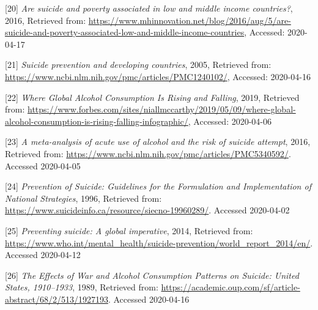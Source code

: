 \documentclass[]{article}
\begin{document}
{[}20{]} \emph{Are suicide and poverty associated in low and middle
income countries?}, 2016, Retrieved from:
\url{https://www.mhinnovation.net/blog/2016/aug/5/are-suicide-and-poverty-associated-low-and-middle-income-countries},
Accessed: 2020-04-17

{[}21{]} \emph{Suicide prevention and developing countries}, 2005,
Retrieved from:
\url{https://www.ncbi.nlm.nih.gov/pmc/articles/PMC1240102/}, Accessed:
2020-04-16

{[}22{]} \emph{Where Global Alcohol Consumption Is Rising and Falling},
2019, Retrieved from:
\url{https://www.forbes.com/sites/niallmccarthy/2019/05/09/where-global-alcohol-consumption-is-rising-falling-infographic/},
Accessed: 2020-04-06

{[}23{]} \emph{A meta-analysis of acute use of alcohol and the risk of
suicide attempt}, 2016, Retrieved from:
\url{https://www.ncbi.nlm.nih.gov/pmc/articles/PMC5340592/}. Accessed
2020-04-05

{[}24{]} \emph{Prevention of Suicide: Guidelines for the Formulation and
Implementation of National Strategies}, 1996, Retrieved from:
\url{https://www.suicideinfo.ca/resource/siecno-19960289/}. Accessed
2020-04-02

{[}25{]} \emph{Preventing suicide: A global imperative}, 2014, Retrieved
from:
\url{https://www.who.int/mental_health/suicide-prevention/world_report_2014/en/}.
Accessed 2020-04-12

{[}26{]} \emph{The Effects of War and Alcohol Consumption Patterns on
Suicide: United States, 1910--1933}, 1989, Retrieved from:
\url{https://academic.oup.com/sf/article-abstract/68/2/513/1927193}.
Accessed 2020-04-16
\end{document}
